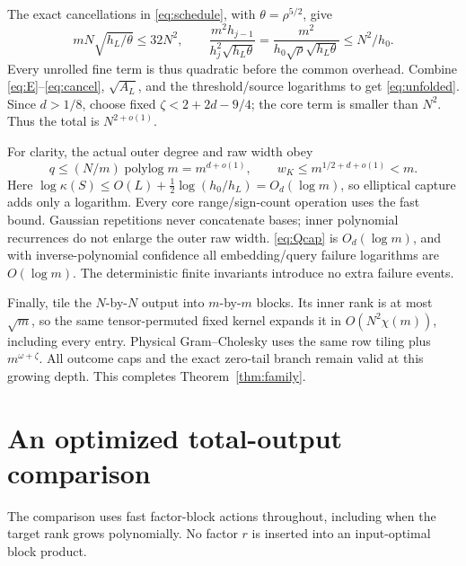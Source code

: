 \documentclass[11pt]{article}
\begin{document}
The exact cancellations in \eqref{eq:schedule}, with
\(\theta=\rho^{5/2}\), give
\begin{equation}\label{eq:cancel}
 mN\sqrt{h_L/\theta}\leq32N^2,\qquad
 \frac{m^2h_{j-1}}{h_j^2\sqrt{h_L\theta}}
 =\frac{m^2}{h_0\sqrt\rho\sqrt{h_L\theta}}
 \leq N^2/h_0.
\end{equation}
Every unrolled fine term is thus quadratic before the common overhead.
Combine \eqref{eq:E}--\eqref{eq:cancel}, \(\sqrt{A_L}\), and the
threshold/source logarithms to get \eqref{eq:unfolded}.
Since \(d>1/8\), choose fixed \(\zeta<2+2d-9/4\); the core term
is smaller than \(N^2\). Thus the total is \(N^{2+o(1)}\).

For clarity, the actual outer degree and raw width obey
\[
 q\leq(N/m)\operatorname{polylog}m=m^{d+o(1)},\qquad
 w_K\leq m^{1/2+d+o(1)}<m.
\]
Here \(\log\kappa(S)\leq O(L)+\tfrac12\log(h_0/h_L)=O_d(\log m)\),
so elliptical capture adds only a logarithm. Every core range/sign-count
operation uses the fast bound. Gaussian repetitions never concatenate
bases; inner polynomial recurrences do not enlarge the outer raw width.
\eqref{eq:Qcap} is \(O_d(\log m)\), and with inverse-polynomial
confidence all embedding/query failure logarithms are \(O(\log m)\).
The deterministic finite invariants introduce no extra failure events.

Finally, tile the \(N\)-by-\(N\) output into \(m\)-by-\(m\) blocks.
Its inner rank is at most \(\sqrt m\), so the same tensor-permuted
fixed kernel expands it in \(O(N^2\chi(m))\), including every entry.
Physical Gram--Cholesky uses the same row tiling plus \(m^{\omega+\zeta}\).
All outcome caps and the exact zero-tail branch remain valid at this
growing depth. This completes Theorem~\ref{thm:family}.

\section{An optimized total-output comparison}
The comparison uses fast factor-block actions throughout, including when
the target rank grows polynomially. No factor \(r\) is inserted into an
input-optimal block product.
\end{document}

